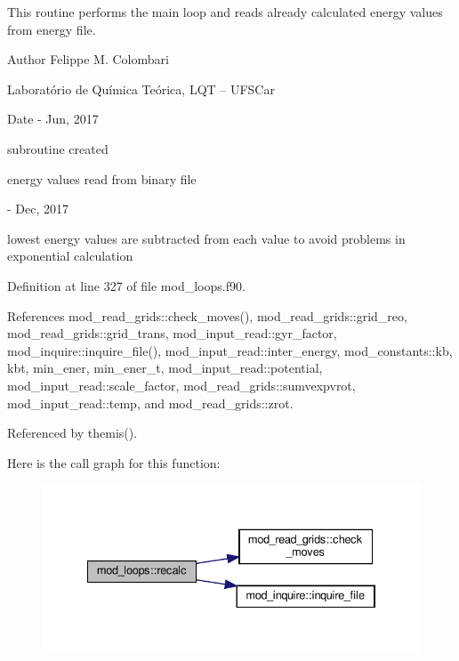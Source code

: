This routine performs the main loop and reads already calculated energy values from energy file. 

\begin{DoxyAuthor}{Author}
Felippe M. Colombari
\begin{DoxyItemize}
\item Laboratório de Química Teórica, L\+QT -- U\+F\+S\+Car 
\end{DoxyItemize}
\end{DoxyAuthor}
\begin{DoxyDate}{Date}
-\/ Jun, 2017
\begin{DoxyItemize}
\item subroutine created
\item energy values read from binary file 
\end{DoxyItemize}

-\/ Dec, 2017
\begin{DoxyItemize}
\item lowest energy values are subtracted from each value to avoid problems in exponential calculation 
\end{DoxyItemize}
\end{DoxyDate}


Definition at line 327 of file mod\+\_\+loops.\+f90.



References mod\+\_\+read\+\_\+grids\+::check\+\_\+moves(), mod\+\_\+read\+\_\+grids\+::grid\+\_\+reo, mod\+\_\+read\+\_\+grids\+::grid\+\_\+trans, mod\+\_\+input\+\_\+read\+::gyr\+\_\+factor, mod\+\_\+inquire\+::inquire\+\_\+file(), mod\+\_\+input\+\_\+read\+::inter\+\_\+energy, mod\+\_\+constants\+::kb, kbt, min\+\_\+ener, min\+\_\+ener\+\_\+t, mod\+\_\+input\+\_\+read\+::potential, mod\+\_\+input\+\_\+read\+::scale\+\_\+factor, mod\+\_\+read\+\_\+grids\+::sumvexpvrot, mod\+\_\+input\+\_\+read\+::temp, and mod\+\_\+read\+\_\+grids\+::zrot.



Referenced by themis().

Here is the call graph for this function\+:
\nopagebreak
\begin{figure}[H]
\begin{center}
\leavevmode
\includegraphics[width=334pt]{namespacemod__loops_a755c1c6e9232a99181d4ac9a7c0c5cff_cgraph}
\end{center}
\end{figure}


